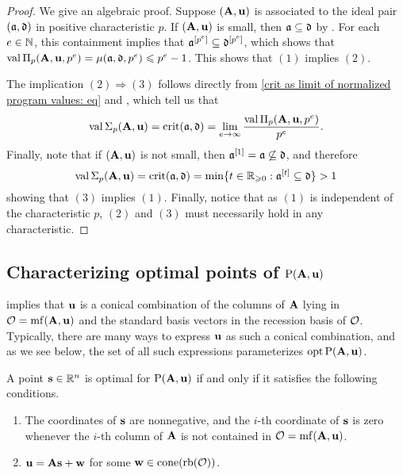 \documentclass{article}
\begin{document}
\begin{proof}
   We give an algebraic proof.
   Suppose $(\mathbf{A},\mathbf{u})$ is associated to the ideal pair $(\mathfrak{a}, \mathfrak{d})$ in positive characteristic $p$.
   If $(\mathbf{A}, \mathbf{u})$ is small, then $\mathfrak{a} \subseteq \mathfrak{d}$ by .
   For each $e\in \mathbb{N}$, this containment implies that $\mathfrak{a}^{[p^e]} \subseteq \mathfrak{d}^{[p^e]}$, which shows that $\operatorname{val} \Pi_p(\mathbf{A}, \mathbf{u}, p^e) = \mu(\mathfrak{a}, \mathfrak{d}, p^e) \leqslant p^e-1$.
   This shows that $(1)$ implies $(2)$.

   The implication $(2) \Rightarrow (3)$ follows directly from \eqref{crit as limit of normalized program values: eq} and , which tell us that
   \[\operatorname{val} \Sigma_p(\mathbf{A},\mathbf{u}) = \operatorname{crit}(\mathfrak{a},\mathfrak{d}) = \lim_{e \to \infty} \frac{\operatorname{val} \Pi_p(\mathbf{A}, \mathbf{u}, p^e)}{p^e}.\]
   Finally, note that if $(\mathbf{A},\mathbf{u})$ is not small, then $\mathfrak{a}^{[1]} = \mathfrak{a}  \not\subseteq \mathfrak{d}$, and therefore
   \[\operatorname{val} \Sigma_p(\mathbf{A},\mathbf{u}) = \operatorname{crit}(\mathfrak{a},\mathfrak{d}) = \min\{t\in \mathbb{R}_{\geqslant 0}: \mathfrak{a}^{[t]} \subseteq \mathfrak{d}\} > 1\]
   showing that $(3)$ implies $(1)$.
   Finally, notice that as $(1)$ is independent of the characteristic $p$, $(2)$ and $(3)$ must necessarily hold in any characteristic.
\end{proof}

\subsection{Characterizing optimal points of $\mathrm{P}(\mathbf{A},\mathbf{u})$}

 implies that $\mathbf{u}$ is a conical combination of the columns of $\mathbf{A}$ lying in $\mathcal{O} = \operatorname{mf}(\mathbf{A},\mathbf{u})$ and the standard basis vectors in the recession basis of $\mathcal{O}$.
Typically, there are many ways to express $\mathbf{u}$ as such a conical combination, and as we see below, the set of all such expressions parameterizes  $\operatorname{opt} \mathrm{P}(\mathbf{A}, \mathbf{u})$.

\begin{proposition}
   \label{opt set: P}
   A point $\mathbf{s} \in \mathbb{R}^n$ is optimal for $\mathrm{P}(\mathbf{A}, \mathbf{u})$ if and only if it satisfies the following conditions.
\begin{enumerate}[$(1)$]
\item  \label{mc coords: e} The coordinates of $\mathbf{s}$ are nonnegative, and the $i$-th coordinate of $\mathbf{s}$ is zero whenever the $i$-th column of $\mathbf{A}$ is not contained in $\mathcal{O} = \operatorname{mf}(\mathbf{A}, \mathbf{u})$.
\item  \label{mc decomposition: e} $\mathbf{u} = \mathbf{A} \mathbf{s} + \mathbf{w}$ for some $\mathbf{w} \in  \operatorname{cone}(\operatorname{rb}(\mathcal{O}))$.
\end{enumerate}
\end{proposition}
\end{document}
